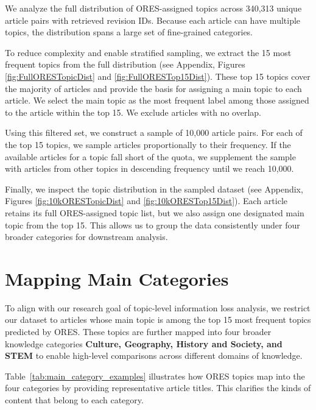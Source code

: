 \documentclass{DESSThesis}
\begin{document}
We analyze the full distribution of ORES-assigned topics across 340{,}313 unique article pairs with retrieved revision IDs. Because each article can have multiple topics, the distribution spans a large set of fine-grained categories.

To reduce complexity and enable stratified sampling, we extract the 15 most frequent topics from the full distribution (see Appendix, Figures \ref{fig:FullORESTopicDist} and \ref{fig:FullORESTop15Dist}). These top 15 topics cover the majority of articles and provide the basis for assigning a main topic to each article. We select the main topic as the most frequent label among those assigned to the article within the top 15. We exclude articles with no overlap.

Using this filtered set, we construct a sample of 10,000 article pairs. For each of the top 15 topics, we sample articles proportionally to their frequency. If the available articles for a topic fall short of the quota, we supplement the sample with articles from other topics in descending frequency until we reach 10,000.

Finally, we inspect the topic distribution in the sampled dataset (see Appendix, Figures \ref{fig:10kORESTopicDist} and \ref{fig:10kORESTop15Dist}). Each article retains its full ORES-assigned topic list, but we also assign one designated main topic from the top 15. This allows us to group the data consistently under four broader categories for downstream analysis.

\section{Mapping Main Categories}

To align with our research goal of topic-level information loss analysis, we restrict our dataset to articles whose main topic is among the top 15 most frequent topics predicted by ORES. These topics are further mapped into four broader knowledge categories \textbf{Culture, Geography, History and Society, and STEM} to enable high-level comparisons across different domains of knowledge. 

Table~\ref{tab:main_category_examples} illustrates how ORES topics map into the four categories by providing representative article titles. This clarifies the kinds of content that belong to each category.
\end{document}
